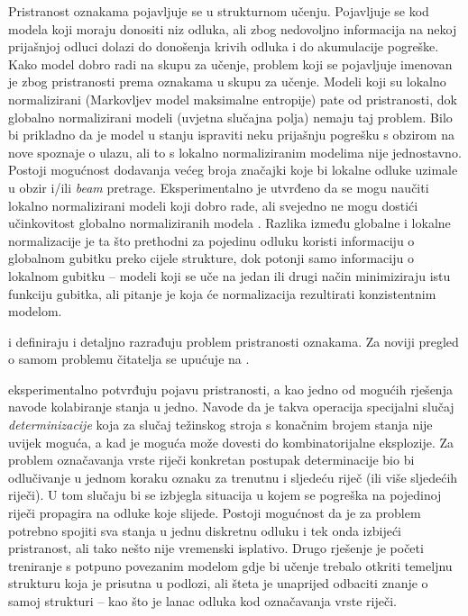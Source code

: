 Pristranost oznakama  pojavljuje se u strukturnom učenju.
Pojavljuje se kod modela koji moraju donositi niz odluka, ali zbog nedovoljno
informacija na nekoj prijašnjoj odluci dolazi do donošenja krivih odluka i do
akumulacije pogreške. Kako model dobro radi na skupu za učenje, problem koji se
pojavljuje imenovan je zbog pristranosti prema oznakama u skupu za učenje.
Modeli koji su lokalno normalizirani (Markovljev model maksimalne entropije)
pate od pristranosti, dok globalno normalizirani modeli (uvjetna slučajna polja)
nemaju taj problem. Bilo bi prikladno da je model u stanju ispraviti neku
prijašnju pogrešku s obzirom na nove spoznaje o ulazu, ali to s lokalno
normaliziranim modelima nije jednostavno. Postoji mogućnost dodavanja većeg
broja značajki koje bi lokalne odluke uzimale u obzir i/ili \textit{beam}
pretrage. Eksperimentalno je utvrđeno da se mogu naučiti lokalno normalizirani
modeli koji dobro rade, ali svejedno ne mogu dostići učinkovitost globalno
normaliziranih modela \citep{liang2008structure}. Razlika između globalne i
lokalne normalizacije je ta što prethodni za pojedinu odluku koristi informaciju
o globalnom gubitku preko cijele strukture, dok potonji samo informaciju o
lokalnom gubitku -- modeli koji se uče na jedan ili drugi način minimiziraju
istu funkciju gubitka, ali pitanje je koja će normalizacija rezultirati
konzistentnim modelom.

\citet*{lafferty2001conditional} i \citet*{leon1991approche} definiraju i
detaljno razrađuju problem pristranosti oznakama. Za noviji pregled o samom
problemu čitatelja se upućuje na \citep{andor2016globally}.

\citet*{lafferty2001conditional} eksperimentalno potvrđuju pojavu pristranosti,
a kao jedno od mogućih rješenja navode kolabiranje stanja u jedno. Navode da je
takva operacija specijalni slučaj \emph{determinizacije} koja za slučaj
težinskog stroja s konačnim brojem stanja nije uvijek moguća, a kad je moguća
može dovesti do kombinatorijalne eksplozije. Za problem označavanja vrste riječi
konkretan postupak determinacije bio bi odlučivanje u jednom koraku oznaku za
trenutnu i sljedeću riječ (ili više sljedećih riječi). U tom slučaju bi se
izbjegla situacija u kojem se pogreška na pojedinoj riječi propagira na odluke
koje slijede. Postoji mogućnost da je za problem potrebno spojiti sva stanja u
jednu diskretnu odluku i tek onda izbijeći pristranost, ali tako nešto nije
vremenski isplativo. Drugo rješenje je početi treniranje s potpuno povezanim
modelom gdje bi učenje trebalo otkriti temeljnu strukturu koja je prisutna u
podlozi, ali šteta je unaprijed odbaciti znanje o samoj strukturi -- kao što je
lanac odluka kod označavanja vrste riječi.

